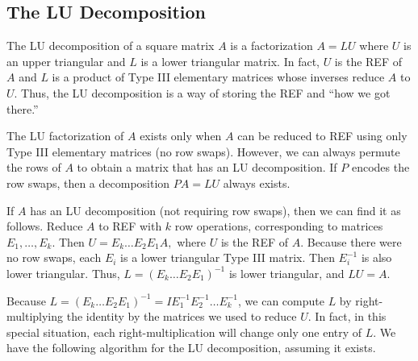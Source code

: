 \subsection*{The LU Decomposition} %

The LU decomposition of a square matrix $A$ is a factorization $A=LU$ where $U$ is an upper triangular and $L$ is a lower triangular matrix. 
In fact, $U$ is the REF of $A$ and $L$ is a product of Type III elementary matrices whose inverses reduce $A$ to $U$. 
Thus, the LU decomposition is a way of storing the REF and ``how we got there.''

The LU factorization of $A$ exists only when $A$ can be reduced to REF using only Type III elementary matrices (no row swaps). 
However, we can always permute the rows of $A$ to obtain a matrix that has an LU decomposition. 
If $P$ encodes the row swaps, then a decomposition $PA = LU$ always exists. 

If $A$ has an LU decomposition (not requiring row swaps), then we can find it as follows. 
Reduce $A$ to REF with $k$ row operations, corresponding to matrices $E_1, \ldots, E_k$. 
Then $U = E_k \ldots E_2E_1A,$ where $U$ is the REF of $A$. 
Because there were no row swaps, each $E_i$ is a lower triangular Type III matrix. Then $E_i^{-1}$ is also lower triangular. 
Thus, $L=(E_k \ldots E_2E_1)^{-1}$ is lower triangular, and $LU=A.$

Because $L=(E_k \ldots E_2E_1)^{-1} = IE_1^{-1}E_2^{-1}\ldots E_k^{-1}$, we can compute $L$ by right-multiplying the identity by the matrices we used to reduce $U$. 
In fact, in this special situation, each right-multiplication will change only one entry of $L$. 
We have the following algorithm for the LU decomposition, assuming it exists.

%
%

